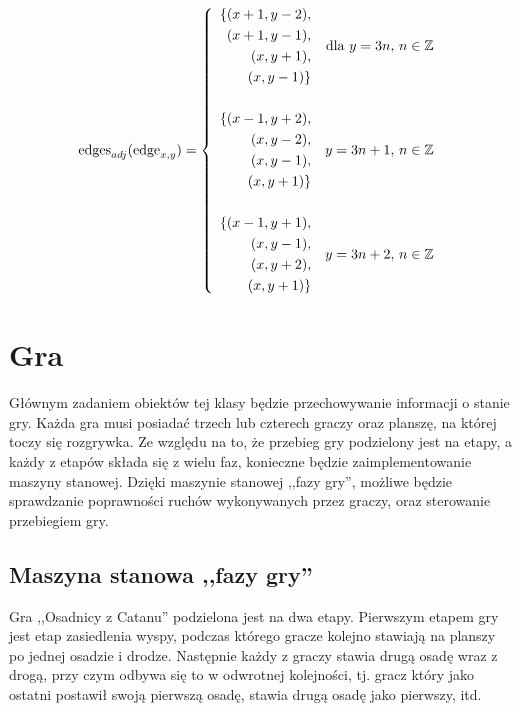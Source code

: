 \documentclass[11pt,twoside]{report}
\begin{document}
\begin{equation}
  \text{edges}_{adj}(\text{edge}_{x,y})=
  \left\{
    \begin{array}{l r@{,~} l}
      \begin{aligned}
        \{
        (x+1, y-2), \\
        (x+1, y-1), \\
        (x, y+1), \\
        (x, y-1)
        \}
      \end{aligned} & \mbox{dla } y=3n & n\in\mathbb{Z} \\[40pt]
      \begin{aligned}
        \{
        (x-1, y+2), \\
        (x, y-2), \\
        (x, y-1), \\
        (x, y+1)
        \}
      \end{aligned} & y=3n+1 & n\in\mathbb{Z} \\[40pt]
      \begin{aligned}
        \{
        (x-1, y+1), \\
        (x, y-1), \\
        (x, y+2), \\
        (x, y+1)
        \}
      \end{aligned} & y=3n+2 & n\in\mathbb{Z} \\
    \end{array} \right.
  \label{edgeedges}
\end{equation}

\section{Gra}
Głównym zadaniem obiektów tej klasy będzie przechowywanie informacji o
stanie gry. Każda gra musi posiadać trzech lub czterech graczy oraz
planszę, na której toczy się rozgrywka. Ze względu na to, że przebieg
gry podzielony jest na etapy, a każdy z etapów składa się z wielu faz,
konieczne będzie zaimplementowanie maszyny stanowej. Dzięki maszynie
stanowej ,,fazy gry'', możliwe będzie sprawdzanie poprawności ruchów
wykonywanych przez graczy, oraz sterowanie przebiegiem gry.

\subsection{Maszyna stanowa ,,fazy gry''}
Gra ,,Osadnicy z Catanu'' podzielona jest na dwa etapy. Pierwszym
etapem gry jest etap zasiedlenia wyspy, podczas którego gracze kolejno
stawiają na planszy po jednej osadzie i drodze. Następnie każdy z
graczy stawia drugą osadę wraz z drogą, przy czym odbywa się to w
odwrotnej kolejności, tj. gracz który jako ostatni postawił swoją
pierwszą osadę, stawia drugą osadę jako pierwszy, itd.
\end{document}
